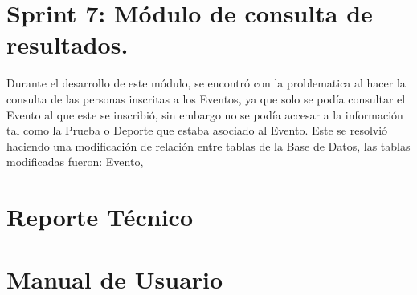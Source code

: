 	
	\section{Sprint 7: Módulo de consulta de resultados.}
	Durante el desarrollo de este módulo, se encontró con la problematica al hacer la consulta de las personas inscritas a los Eventos, ya que solo se podía consultar el Evento al que este se inscribió, sin embargo no se podía accesar a la información tal como la Prueba o Deporte que estaba asociado al Evento.
	Este se resolvió haciendo una modificación de relación entre tablas de la Base de Datos, las tablas modificadas fueron: Evento, 
	
	
	\section{Reporte Técnico}
	
	\section{Manual de Usuario}